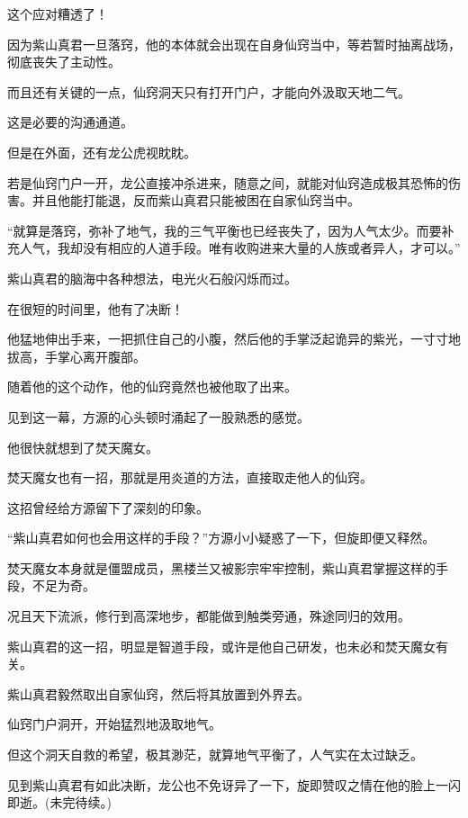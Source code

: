 \begin{this_body}
这个应对糟透了！

因为紫山真君一旦落窍，他的本体就会出现在自身仙窍当中，等若暂时抽离战场，彻底丧失了主动性。

而且还有关键的一点，仙窍洞天只有打开门户，才能向外汲取天地二气。

这是必要的沟通通道。

但是在外面，还有龙公虎视眈眈。

若是仙窍门户一开，龙公直接冲杀进来，随意之间，就能对仙窍造成极其恐怖的伤害。并且他能打能退，反而紫山真君只能被困在自家仙窍当中。

“就算是落窍，弥补了地气，我的三气平衡也已经丧失了，因为人气太少。而要补充人气，我却没有相应的人道手段。唯有收购进来大量的人族或者异人，才可以。”

紫山真君的脑海中各种想法，电光火石般闪烁而过。

在很短的时间里，他有了决断！

他猛地伸出手来，一把抓住自己的小腹，然后他的手掌泛起诡异的紫光，一寸寸地拔高，手掌心离开腹部。

随着他的这个动作，他的仙窍竟然也被他取了出来。

见到这一幕，方源的心头顿时涌起了一股熟悉的感觉。

他很快就想到了焚天魔女。

焚天魔女也有一招，那就是用炎道的方法，直接取走他人的仙窍。

这招曾经给方源留下了深刻的印象。

“紫山真君如何也会用这样的手段？”方源小小疑惑了一下，但旋即便又释然。

焚天魔女本身就是僵盟成员，黑楼兰又被影宗牢牢控制，紫山真君掌握这样的手段，不足为奇。

况且天下流派，修行到高深地步，都能做到触类旁通，殊途同归的效用。

紫山真君的这一招，明显是智道手段，或许是他自己研发，也未必和焚天魔女有关。

紫山真君毅然取出自家仙窍，然后将其放置到外界去。

仙窍门户洞开，开始猛烈地汲取地气。

但这个洞天自救的希望，极其渺茫，就算地气平衡了，人气实在太过缺乏。

见到紫山真君有如此决断，龙公也不免讶异了一下，旋即赞叹之情在他的脸上一闪即逝。(未完待续。)

\end{this_body}


